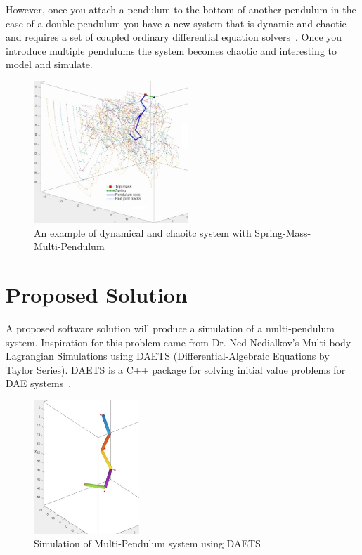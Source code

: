\documentclass{article}
\begin{document}
However, once you attach a pendulum to the bottom of another pendulum in the
case of a double pendulum you have a new system that is dynamic and chaotic and
requires a set of coupled ordinary differential equation 
solvers~\cite{DoublePendulum}. Once you introduce multiple pendulums the system 
becomes chaotic and interesting to model and simulate.

\begin{figure}[h]
	\centering
	\includegraphics[width=220px]{multi-pend.jpg}
	\caption{An example of dynamical and chaoitc system with
	Spring-Mass-Multi-Pendulum~\cite{MathPendulum}}
	\label{fig:multipend}
\end{figure}

\section*{Proposed Solution}
A proposed software solution will produce a simulation of a multi-pendulum
system. Inspiration for this problem came from Dr. Ned Nedialkov's Multi-body
Lagrangian Simulations using DAETS (Differential-Algebraic Equations by Taylor
Series). DAETS is a C++ package for solving initial value problems for DAE
systems~\cite{DAETS}.

\begin{figure}[h]
	\centering
	\includegraphics[width=150px]{3pend.jpg}
	\caption{Simulation of Multi-Pendulum system using 
	DAETS~\cite{MathPendulum}}
	\label{fig:simpendula}
\end{figure}
\end{document}
